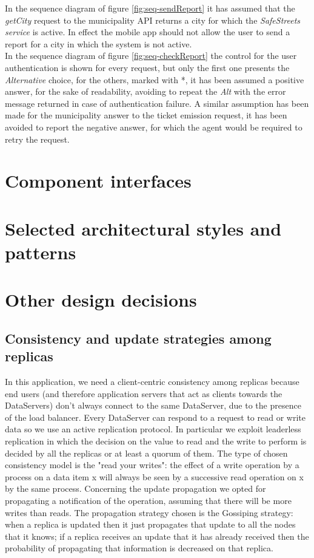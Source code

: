 \documentclass[a4paper]{report}
\begin{document}
In the sequence diagram of figure \ref{fig:seq-sendReport} it has assumed that the \textit{getCity} request to the municipality API returns a city for which the \textit{SafeStreets service} is active. In effect the mobile app should not allow the user to send a report for a city in which the system is not active.\\
In the sequence diagram of figure \ref{fig:seq-checkReport} the control for the user authentication is shown for every request, but only the first one presents the \textit{Alternative} choice, for the others, marked with *, it has been assumed a positive answer, for the sake of readability, avoiding to repeat the \textit{Alt} with the error message returned in case of authentication failure. 
A similar assumption has been made for the municipality answer to the ticket emission request, it has been avoided to report the negative answer, for which the agent would be required to retry the request.

\section{Component interfaces}


\section{Selected architectural	styles and patterns}
\section{Other design decisions}
\subsection{Consistency and update strategies among replicas}
In this application,  we need a client-centric consistency among replicas because end users (and therefore application servers that act as clients towards the DataServers) don't always connect to the same DataServer, due to the presence of the load balancer. Every DataServer can respond to a request to read or write data so we use an active replication protocol. In particular we exploit leaderless replication in which the decision on the value to read and the write to perform is decided by all the replicas or at least a quorum of them. The type of chosen consistency model  is the "read your writes": the effect of a write operation by a process on a data item x will always be seen by a successive read operation on x by the same process. 
Concerning the update propagation we opted for propagating a notification of the operation, assuming that there will be more writes than reads.  The propagation strategy chosen is the Gossiping strategy: when a replica is updated then it just propagates that update to all the nodes that it knows; if a replica receives an update that it has already received then the probability of propagating that information is decreased on that replica. 
\end{document}
